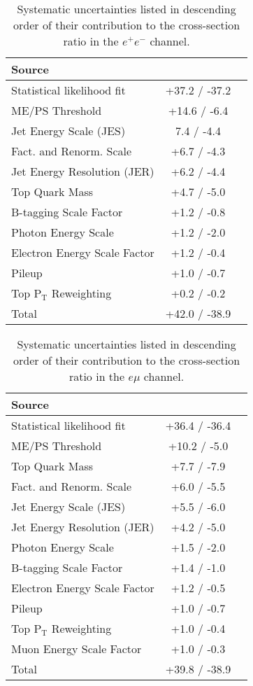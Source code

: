 \begin{table}[h!] 
\centering
\begin{tabular}{|l|c|c|}
\hline
\textbf{Source} & {\textbf{Ratio Change (\%)} \\
\hline
Statistical likelihood fit & +37.2 / -37.2 \\
ME/PS Threshold & +14.6 / -6.4\\
Jet Energy Scale (JES) & 7.4 / -4.4\\
Fact. and Renorm. Scale & +6.7 / -4.3\\
Jet Energy Resolution (JER) & +6.2 / -4.4\\
Top Quark Mass &  +4.7 / -5.0\\
B-tagging Scale Factor & +1.2 / -0.8\\
Photon Energy Scale & +1.2 / -2.0\\
Electron Energy Scale Factor & +1.2 / -0.4\\
Pileup & +1.0 / -0.7 \\
Top P$_{\text{T}}$ Reweighting & +0.2 / -0.2\\
\hline
Total & +42.0 / -38.9 \\
\hline
\end{tabular} 
\caption{Systematic uncertainties listed in descending order of their contribution to the cross-section ratio in the $e^+e^-$ channel.}
\label{tab-systuncertsEE}
\end{table}

\begin{table}[h!] 
\centering
\begin{tabular}{|l|c|c|}
\hline
\textbf{Source} & {\textbf{Ratio Change (\%)} \\
\hline
Statistical likelihood fit & +36.4 / -36.4\\
ME/PS Threshold & +10.2 / -5.0 \\
Top Quark Mass &  +7.7 / -7.9\\
Fact. and Renorm. Scale & +6.0 / -5.5\\
Jet Energy Scale (JES) & +5.5 / -6.0\\
Jet Energy Resolution (JER) & +4.2 / -5.0\\
Photon Energy Scale & +1.5 / -2.0\\
B-tagging Scale Factor & +1.4 / -1.0\\
Electron Energy Scale Factor & +1.2 / -0.5\\
Pileup & +1.0 / -0.7\\
Top P$_{\text{T}}$ Reweighting & +1.0 / -0.4\\
Muon Energy Scale Factor & +1.0 / -0.3\\
\hline
Total & +39.8 / -38.9\\
\hline
\end{tabular} 
\caption{Systematic uncertainties listed in descending order of their contribution to the cross-section ratio in the $e\mu$ channel.}
\label{tab-systuncertsEMu}
\end{table}

